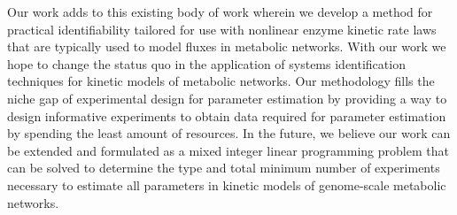 \documentclass[10pt]{article}
\begin{document}
	Our work adds to this existing body of work wherein we develop a method for practical identifiability tailored for use with nonlinear enzyme kinetic rate laws that are typically used to model fluxes in metabolic networks. With our work we hope to change the status quo in the application of systems identification techniques for kinetic models of metabolic networks. Our methodology fills the niche gap of experimental design for parameter estimation by providing a way to design informative experiments to obtain data required for parameter estimation by spending the least amount of resources.	
	In the future, we believe our work can be extended and formulated as a mixed integer linear programming problem that can be solved to determine the type and total minimum number of experiments necessary to estimate all parameters in kinetic models of genome-scale metabolic networks.
	
	\printbibliography	
\end{document}
